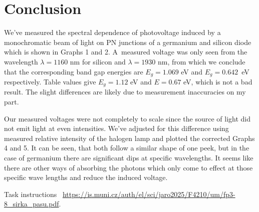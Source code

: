 \documentclass[a4paper,11pt]{article}
\begin{document}
\section{Conclusion}

We've measured the spectral dependence of photovoltage induced by a monochromatic beam of light on PN junctions of a germanium and silicon diode which is shown in Graphs 1 and 2. A~measured voltage was only seen from the wavelength $ \lambda = 1160 $ nm for silicon and $ \lambda = 1930 $ nm, from which we conclude that the corresponding band gap energies are $ E_g = 1.069 $ eV and $ E_g = 0.642 $~eV respectively. Table values give $ E_g = 1.12 $ eV and $ E = 0.67 $ eV, which is not a bad result. The slight differences are likely due to measurement inaccuracies on my part.

Our measured voltages were not completely to scale since the source of light did not emit light at even intensities. We've adjusted for this difference using measured relative intensity of the halogen lamp and plotted the corrected Graphs 4 and 5. It can be seen, that both follow a similar shape of one peek, but in the case of germanium there are significant dips at specific wavelengths. It seems like there are other ways of absorbing the photons which only come to effect at those specific wave lengths and reduce the induced voltage. 

\begin{thebibliography}{0}
 Task instructions ~\url{https://is.muni.cz/auth/el/sci/jaro2025/F4210/um/fp3-8_sirka_pasu.pdf}.   
\end{thebibliography}
\end{document}
